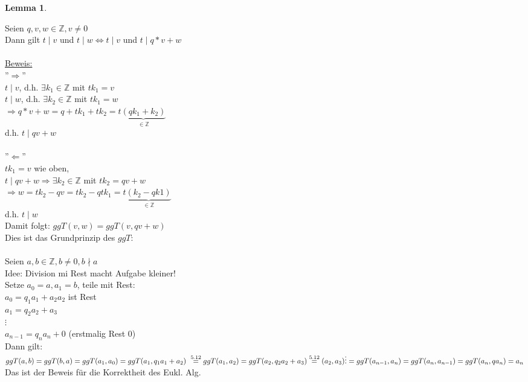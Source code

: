 \documentclass[a4paper,11pt]{article}
\newtheorem{lemma}[definition]{Lemma}
\newcommand{\hsp}{\hspace{5mm}}
\begin{document}
\begin{lemma}
\end{lemma}
Seien $q,v,w\in\mathbb{Z},v\neq0$ \\
Dann gilt $t\mid v$ und $t\mid w\Leftrightarrow t\mid v$ und $t\mid q*v+w$ \\
\\
\underline{Beweis:} \\
''$\Rightarrow$'' \\
$t\mid v$, d.h. $\exists k_1\in\mathbb{Z}$ mit $tk_1=v$ \\
$t\mid w$, d.h. $\exists k_2\in\mathbb{Z}$ mit $tk_1=w$ \\
$\Rightarrow q*v+w=q+tk_1+tk_2=t\underbrace{(qk_1+k_2)}_{\in\mathbb{Z}}$ \\
d.h. $t\mid qv+w$ \\ \\
''$\Leftarrow$'' \\
$tk_1=v$ wie oben, \\
$t\mid qv+w\Rightarrow\exists k_2\in\mathbb{Z}$ mit $tk_2=qv+w$ \\
$\Rightarrow w=tk_2-qv=tk_2-qtk_1=t\underbrace{(k_2-qk1)}_{\in\mathbb{Z}}$ \\
d.h. $t\mid w$ \\
Damit folgt: $ggT(v,w)=ggT(v,qv+w)$ \\
Dies ist das Grundprinzip des $ggT$: \\
\\
Seien $a,b\in\mathbb{Z},b\neq0,b\nmid a$ \\
Idee: Division mi Rest macht Aufgabe kleiner! \\
Setze $a_0=a, a_1=b$, teile mit Rest: \\
$a_0=q_1a_1+a_2$\hsp $a_2$ ist Rest \\
$a_1=q_2a_2+a_3$ \\
$\vdots$ \\
$a_{n-1}=q_na_n+0$ (erstmalig Rest 0) \\
Dann gilt: \\
$ggT(a,b)=ggT(b,a) \\
=ggT(a_1,a_0) \\
=ggT(a_1,q_1a_1+a_2) \\\
\overset{5.12}{=}ggT(a_1,a_2) \\
=ggT(a_2,q_2a_2+a_3) \\
\overset{5.12}{=}(a_2,a_3) \\
\vdots \\
=ggT(a_{n-1},a_n) \\
=ggT(a_n,a_{n-1}) \\
=ggT(a_n,qa_n) \\
=a_n$ \\
Das ist der Beweis für die Korrektheit des Eukl. Alg.
\end{document}
